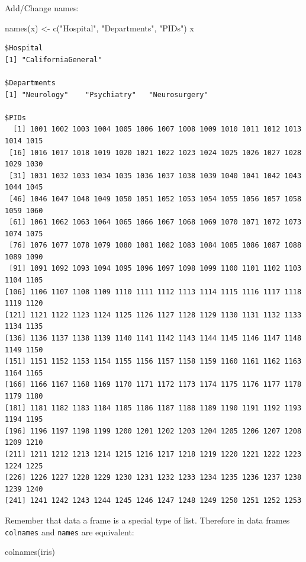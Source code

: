 \documentclass[
]{book}
\newenvironment{Shaded}{\begin{snugshade}}{\end{snugshade}}
\newcommand{\FunctionTok}[1]{\textcolor[rgb]{0.00,0.00,0.00}{#1}}
\newcommand{\NormalTok}[1]{#1}
\newcommand{\OtherTok}[1]{\textcolor[rgb]{0.56,0.35,0.01}{#1}}
\newcommand{\StringTok}[1]{\textcolor[rgb]{0.31,0.60,0.02}{#1}}
\begin{document}
Add/Change names:

\begin{Shaded}
\begin{Highlighting}[]
\FunctionTok{names}\NormalTok{(x) }\OtherTok{\textless{}{-}} \FunctionTok{c}\NormalTok{(}\StringTok{"Hospital"}\NormalTok{, }\StringTok{"Departments"}\NormalTok{, }\StringTok{"PIDs"}\NormalTok{)}
\NormalTok{x}
\end{Highlighting}
\end{Shaded}

\begin{verbatim}
$Hospital
[1] "CaliforniaGeneral"

$Departments
[1] "Neurology"    "Psychiatry"   "Neurosurgery"

$PIDs
  [1] 1001 1002 1003 1004 1005 1006 1007 1008 1009 1010 1011 1012 1013 1014 1015
 [16] 1016 1017 1018 1019 1020 1021 1022 1023 1024 1025 1026 1027 1028 1029 1030
 [31] 1031 1032 1033 1034 1035 1036 1037 1038 1039 1040 1041 1042 1043 1044 1045
 [46] 1046 1047 1048 1049 1050 1051 1052 1053 1054 1055 1056 1057 1058 1059 1060
 [61] 1061 1062 1063 1064 1065 1066 1067 1068 1069 1070 1071 1072 1073 1074 1075
 [76] 1076 1077 1078 1079 1080 1081 1082 1083 1084 1085 1086 1087 1088 1089 1090
 [91] 1091 1092 1093 1094 1095 1096 1097 1098 1099 1100 1101 1102 1103 1104 1105
[106] 1106 1107 1108 1109 1110 1111 1112 1113 1114 1115 1116 1117 1118 1119 1120
[121] 1121 1122 1123 1124 1125 1126 1127 1128 1129 1130 1131 1132 1133 1134 1135
[136] 1136 1137 1138 1139 1140 1141 1142 1143 1144 1145 1146 1147 1148 1149 1150
[151] 1151 1152 1153 1154 1155 1156 1157 1158 1159 1160 1161 1162 1163 1164 1165
[166] 1166 1167 1168 1169 1170 1171 1172 1173 1174 1175 1176 1177 1178 1179 1180
[181] 1181 1182 1183 1184 1185 1186 1187 1188 1189 1190 1191 1192 1193 1194 1195
[196] 1196 1197 1198 1199 1200 1201 1202 1203 1204 1205 1206 1207 1208 1209 1210
[211] 1211 1212 1213 1214 1215 1216 1217 1218 1219 1220 1221 1222 1223 1224 1225
[226] 1226 1227 1228 1229 1230 1231 1232 1233 1234 1235 1236 1237 1238 1239 1240
[241] 1241 1242 1243 1244 1245 1246 1247 1248 1249 1250 1251 1252 1253
\end{verbatim}

Remember that data a frame is a special type of list. Therefore in data frames \texttt{colnames} and \texttt{names} are equivalent:

\begin{Shaded}
\begin{Highlighting}[]
\FunctionTok{colnames}\NormalTok{(iris)}
\end{Highlighting}
\end{Shaded}
\end{document}
